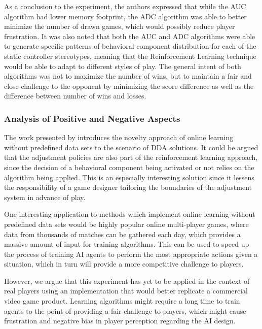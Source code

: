 As a conclusion to the experiment, the authors expressed that while the AUC algorithm had lower memory footprint, the ADC algorithm was able to better minimize the number of drawn games, which would possibly reduce player frustration. It was also noted that both the AUC and ADC algorithms were able to generate specific patterns of behavioral component distribution for each of the static controller stereotypes, meaning that the Reinforcement Learning technique would be able to adapt to different styles of play. The general intent of both algorithms was not to maximize the number of wins, but to maintain a fair and close challenge to the opponent by minimizing the score difference as well as the difference between number of wins and losses.

\subsubsection{Analysis of Positive and Negative Aspects}

The work presented by \citet{article_adaptivebehaviorai} introduces the novelty approach of online learning without predefined data sets to the scenario of DDA solutions. It could be argued that the adjustment policies are also part of the reinforcement learning approach, since the decision of a behavioral component being activated or not relies on the algorithm being applied. This is an especially interesting solution since it lessens the responsibility of a game designer tailoring the boundaries of the adjustment system in advance of play.

One interesting application to methods which implement online learning without predefined data sets would be highly popular online multi-player games, where data from thousands of matches can be gathered each day, which provides a massive amount of input for training algorithms. This can be used to speed up the process of training AI agents to perform the most appropriate actions given a situation, which in turn will provide a more competitive challenge to players.


However, we argue that this experiment has yet to be applied in the context of real players using an implementation that would better replicate a commercial video game product. Learning algorithms might require a long time to train agents to the point of providing a fair challenge to players, which might cause frustration and negative bias in player perception regarding the AI design.

